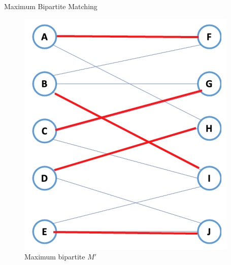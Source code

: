 \documentclass{article}
\numberwithin{table}{section}
\numberwithin{figure}{section}
\begin{document}
\begin{section}{Maximum Bipartite Matching}
\begin{enumerate}[(A)]
\begin{tcolorbox}[breakable]
        \begin{figure}[H]
            \centering
            \includegraphics[width=0.4\linewidth]{figures/p4/5.png}
            \caption{Maximum bipartite $M'$} 
        \end{figure}
    \end{tcolorbox}
    \end{enumerate}
\end{section}
\end{document}
